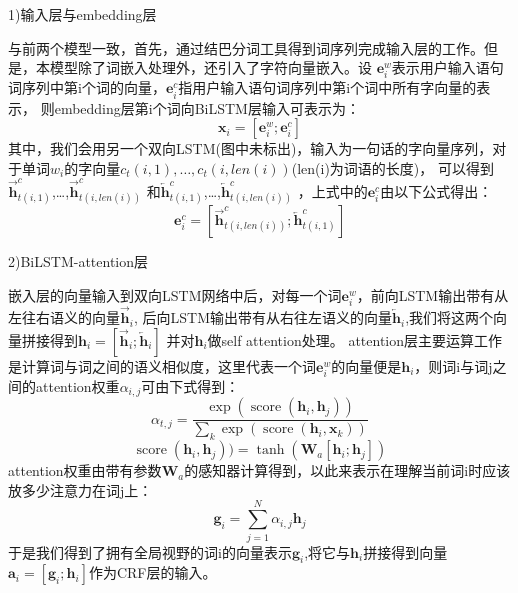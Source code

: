 1)输入层与embedding层

与前两个模型一致，首先，通过结巴分词工具得到词序列完成输入层的工作。但是，本模型除了词嵌入处理外，还引入了字符向量嵌入。设
$\mathbf{e}_{i}^{w}$表示用户输入语句词序列中第i个词的向量，$\mathbf{e}_{i}^{c}$指用户输入语句词序列中第i个词中所有字向量的表示，
则embedding层第i个词向BiLSTM层输入可表示为：
\begin{equation}
  \mathbf{x}_{i}=[\mathbf{e}_{i}^{w} ;\mathbf{e}_{i}^{c}]
\end{equation}
其中，我们会用另一个双向LSTM(图中未标出)，输入为一句话的字向量序列，对于单词$w_i$的字向量$c_t(i,1),\dots,c_t(i,len(i))$(len(i)为词语的长度)，
可以得到$\overrightarrow{\mathbf{h}}_{t(i, 1)}^{c}$,\dots,$\overrightarrow{\mathbf{h}}_{t(i, len(i))}^{c}$
和$\overleftarrow{\mathbf{h}}_{t(i, 1)}^{c}$,\dots,$\overleftarrow{\mathbf{h}}_{t(i, len(i))}^{c}$ ，上式中的$\mathbf{e}_{i}^{c}$由以下公式得出：
\begin{equation}
  \mathbf{e}_{i}^{c}=[\overrightarrow{\mathbf{h}}_{t(i, len(i))}^{c} ; \overleftarrow{\mathbf{h}}_{t(i, 1)}^{c}]
\end{equation}

2)BiLSTM-attention层

嵌入层的向量输入到双向LSTM网络中后，对每一个词$\mathbf{e}_{i}^{w}$，前向LSTM输出带有从左往右语义的向量$\overrightarrow{\mathbf{h}}_{i}$,
后向LSTM输出带有从右往左语义的向量$\overleftarrow{\mathbf{h}}_{i}$,我们将这两个向量拼接得到$\mathbf{h}_{i}=[\overrightarrow{\mathbf{h}}_{i} ;\overleftarrow{\mathbf{h}}_{i}]$
并对$\mathbf{h}_{i}$做self attention处理。
attention层主要运算工作是计算词与词之间的语义相似度，这里代表一个词$\mathbf{e}_{i}^{w}$的向量便是$\mathbf{h}_{i}$，则词i与词j之间的attention权重$α_{i,j}$可由下式得到：
\begin{equation}
\alpha_{t, j}=\frac{\exp \left(\operatorname{score}\left(\mathbf{h}_{i}, \mathbf{h}_{j}\right)\right)}{\sum_{k} \exp \left(\operatorname{score}\left(\mathbf{h}_{i}, \mathbf{x}_{k}\right)\right)}
\end{equation}
\begin{equation}
  \operatorname{score}(\mathbf{h}_{i}, \mathbf{h}_{j}))=\tanh \left(\mathbf{W}_{a}\left[\mathbf{h}_{i} ; \mathbf{h}_{j}\right]\right)
\end{equation}
attention权重由带有参数$\mathbf{W}_{a}$的感知器计算得到，以此来表示在理解当前词i时应该放多少注意力在词j上：
\begin{equation}
  \mathbf{g}_{i}=\sum_{j=1}^{N} \alpha_{i, j} \mathbf{h}_{j}
\end{equation}
于是我们得到了拥有全局视野的词i的向量表示$\mathbf{g}_{i}$,将它与$\mathbf{h}_{i}$拼接得到向量$\mathbf{a}_{i}=[\mathbf{g}_{i} ;\mathbf{h}_{i}]$作为CRF层的输入。

